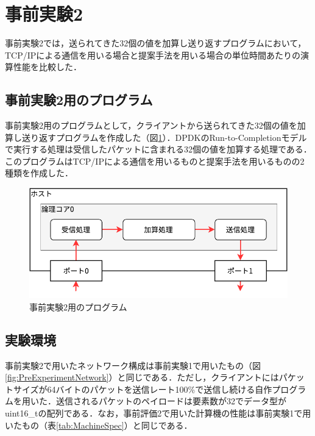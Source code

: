 \section{事前実験2}
\label{sec:PreExperimentTwo}
事前実験2では，送られてきた32個の値を加算し送り返すプログラムにおいて，TCP/IPによる通信を用いる場合と提案手法を用いる場合の単位時間あたりの演算性能を比較した．

\subsection{事前実験2用のプログラム}
事前実験2用のプログラムとして，クライアントから送られてきた32個の値を加算し送り返すプログラムを作成した（図\ref{fig:PreExperimentTwo}）．DPDKのRun-to-Completionモデルで実行する処理は受信したパケットに含まれる32個の値を加算する処理である．このプログラムはTCP/IPによる通信を用いるものと提案手法を用いるものの2種類を作成した．

\begin{figure}[htb]
  \centering
  \includegraphics[width=\columnwidth]{pictures/PreExperimentTwo.pdf}
  \caption{事前実験2用のプログラム}
  \label{fig:PreExperimentTwo}
\end{figure}

\subsection{実験環境}
事前実験2で用いたネットワーク構成は事前実験1で用いたもの（図\ref{fig:PreExperimentNetwork}）と同じである．ただし，クライアントにはパケットサイズが64バイトのパケットを送信レート100\%で送信し続ける自作プログラムを用いた．送信されるパケットのペイロードは要素数が32でデータ型がuint16\_tの配列である．なお，事前評価2で用いた計算機の性能は事前実験1で用いたもの（表\ref{tab:MachineSpec}）と同じである．


